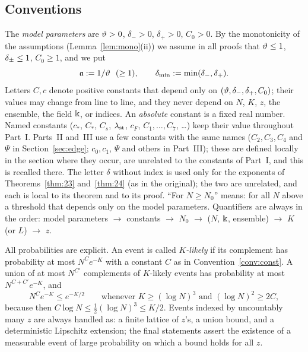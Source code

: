 \subsection{Conventions}\label{sec:conv}
\begin{convention}[Constants]\label{conv:const}
The \emph{model parameters} are $\vartheta>0$, $\delta_->0$, $\delta_+>0$, $C_0>0$. By the monotonicity of the assumptions
(Lemma~\ref{lem:mono}(ii)) we assume in all proofs that $\vartheta\le1$, $\delta_\pm\le1$, $C_0\ge1$, and we put
\[
 \mathfrak{a}:=1/\vartheta\ \ (\ge1),\qquad \delta_{\min}:=\min(\delta_-,\delta_+).
\]
Letters $C,c$ denote positive constants that depend only on $(\vartheta,\delta_-,\delta_+,C_0)$; their values may change from
line to line, and they never depend on $N$, $K$, $z$, the ensemble, the field $\Bbbk$, or indices. An \emph{absolute} constant is a fixed real number.
Named constants ($c_*$, $C_*$, $C_s$, $\lambda_{\rm st}$, $c_F$, $C_1,\dots,C_7$, \dots) keep their value throughout Part~I. Parts~II and~III use a few
constants with the same names ($C_2,C_3,C_4$ and $\Psi$ in Section~\ref{sec:edge}; $c_0,c_1$, $\Psi$ and others in Part~III); these are defined locally in the section where they occur,
are unrelated to the constants of Part~I, and this is recalled there. The letter $\delta$ without index is used only for the exponents of Theorems~\ref{thm:23} and~\ref{thm:24}
(as in the original); the two are unrelated, and each is local to its theorem and to its proof.
``For $N\ge N_0$'' means: for all $N$ above a threshold that depends only on the model parameters.
Quantifiers are always in the order: model parameters $\to$ constants $\to$ $N_0$ $\to$ ($N$, $\Bbbk$, ensemble) $\to$ $K$ (or $L$) $\to$ $z$.
\end{convention}
\begin{convention}[Probability]\label{conv:prob}
All probabilities are explicit. An event is called \emph{$K$-likely} if its complement has probability at most $N^{C}e^{-K}$
with a constant $C$ as in Convention~\ref{conv:const}. A union of at most $N^{C'}$ complements of $K$-likely events has probability
at most $N^{C+C'}e^{-K}$, and
\[
 N^{C}e^{-K}\le e^{-K/2}\qquad\text{whenever }K\ge(\log N)^3\text{ and }(\log N)^2\ge2C,
\]
because then $C\log N\le\frac12(\log N)^3\le K/2$. Events indexed by uncountably many $z$
are always handled as: a finite lattice of $z$'s, a union bound, and a deterministic Lipschitz extension; the final statements
assert the existence of a measurable event of large probability on which a bound holds for all $z$.
\end{convention}
